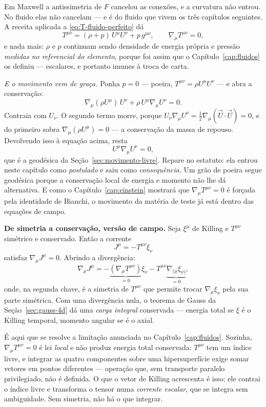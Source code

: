 \documentclass[12pt,a4paper,oneside]{book}
\theoremstyle{rgplain}
\theoremstyle{rgremark}
\begin{document}
Em Maxwell a antissimetria de $F$ cancelou as conexões, e a curvatura não
entrou. No fluido elas não cancelam --- e é do fluido que vivem os três
capítulos seguintes. A receita aplicada a \eqref{eq:T-fluido-perfeito} dá
\begin{equation}
  T^{\mu\nu}=(\rho+p)\,U^\mu U^\nu+p\,g^{\mu\nu} ,
  \qquad
  \nabla_\mu T^{\mu\nu}=0 ,
  \label{eq:T-fluido-curvo}
\end{equation}
e nada mais: $\rho$ e $p$ continuam sendo densidade de energia própria e
pressão \emph{medidas no referencial do elemento}, porque foi assim que o
Capítulo~\ref{cap:fluidos} os definiu --- escalares, e portanto imunes à troca
de carta.

\emph{E o movimento vem de graça.} Ponha $p=0$ --- poeira,
$T^{\mu\nu}=\rho U^\mu U^\nu$ --- e abra a conservação:
\[
  \nabla_\mu(\rho U^\mu)\,U^\nu+\rho\,U^\mu\nabla_\mu U^\nu=0 .
\]
Contraia com $U_\nu$. O segundo termo morre, porque
$U_\nu\nabla_\mu U^\nu=\tfrac12\nabla_\mu(\vec U\cdot\vec U)=0$, e do primeiro
sobra $\nabla_\mu(\rho U^\mu)=0$ --- a conservação da massa de repouso.
Devolvendo isso à equação acima, resta
\[
  U^\mu\nabla_\mu U^\nu=0 ,
\]
que é a geodésica da Seção~\ref{sec:movimento-livre}. Repare no estatuto: ela
entrou neste capítulo como \emph{postulado} e saiu como \emph{consequência}. Um
grão de poeira segue geodésica porque a conservação local de energia e momento
não lhe dá alternativa. E como o
Capítulo~\ref{cap:einstein} mostrará que $\nabla_\mu T^{\mu\nu}=0$ é forçada
pela identidade de Bianchi, o movimento da matéria de teste já está dentro das
equações de campo.

\begin{resultado}
\textbf{De simetria a conservação, versão de campo.} Seja $\xi^\mu$ de Killing
e $T^{\mu\nu}$ simétrico e conservado. Então a corrente
\[
  J^\mu=-T^{\mu\nu}\xi_\nu
\]
satisfaz $\nabla_\mu J^\mu=0$. Abrindo a divergência:
\[
  \nabla_\mu J^\mu
  =-\underbrace{(\nabla_\mu T^{\mu\nu})}_{=0}\xi_\nu
  -T^{\mu\nu}\underbrace{\nabla_{(\mu}\xi_{\nu)}}_{=0} ,
\]
onde, na segunda chave, é a simetria de $T^{\mu\nu}$ que permite trocar
$\nabla_\mu\xi_\nu$ pela sua parte simétrica. Com uma divergência nula, o
teorema de Gauss da Seção~\ref{sec:gauss-4d} dá uma \emph{carga integral}
conservada --- energia total se $\xi$ é o Killing temporal, momento angular se
é o axial.
\end{resultado}

\begin{atencao}
É aqui que se resolve a limitação anunciada no Capítulo~\ref{cap:fluidos}.
Sozinha, $\nabla_\mu T^{\mu\nu}=0$ é lei \emph{local} e não produz energia
total conservada: $T^{\mu\nu}$ tem um índice livre, e integrar as quatro
componentes sobre uma hipersuperfície exige somar vetores em pontos diferentes
--- operação que, sem transporte paralelo privilegiado, não é definida. O que o
vetor de Killing acrescenta é isso: ele contrai o índice livre e
transforma o tensor numa \emph{corrente escalar}, que se integra sem
ambiguidade. Sem simetria, não há o que integrar.
\end{atencao}
\end{document}
